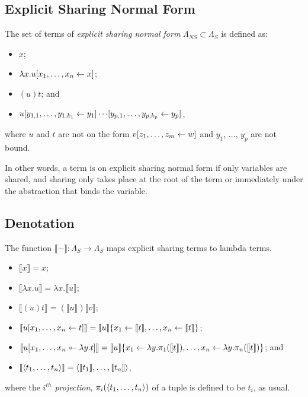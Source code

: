 \documentclass[11pt,a4paper]{article}
\theoremstyle{definition}
\theoremstyle{plain}
\theoremstyle{remark}
\begin{document}
\subsection{Explicit Sharing Normal Form}

The set of terms of \emph{explicit sharing normal form} $\Lambda_{NS}\subset\Lambda_S$ is defined as:

\begin{itemize}
	\item $x$;
	\item $\lambda x.{ { {u}[{{x_1},\dots,{x_n}}\leftarrow{x}] } }$;
	\item $(u)t$; and 
	\item ${ { {{ { {u}[{{y_{1,1}},\dots,{y_{1,k_1}}}\leftarrow{y_1}] } }\cdots}[{{y_{p,1}},\dots,{y_{p,k_p}}}\leftarrow{y_p}] } }$,
\end{itemize}
where $u$ and $t$ are not on the form ${ { {v}[{{z_1},\dots,{z_m}}\leftarrow{w}] } }$ and $y_1$, $\dots$, $y_p$ are not bound.

In other words, a term is on explicit sharing normal form if only variables are shared, and sharing only takes place at the root of the term or immediately under the abstraction that binds the variable.

\subsection{Denotation}

\newcommand{\terden}[1]{{\llbracket{#1}\rrbracket}}
\newcommand{\terpr}[2]{{\pi_{#1}({#2})}}

The function $\terden{-}:\Lambda_S\rightarrow\Lambda_S$ maps explicit sharing terms to lambda terms.

\begin{itemize}
	\item $\terden{x}=x$;
	\item $\terden{\lambda x.u}=\lambda x.\terden{u}$;
	\item $\terden{(u)t}=(\terden{u})\terden{v}$;
	\item $\terden{\tershare{u}{x_1}{x_n}{t}}=\tersubn{\terden{u}}{x_1}{\terden{t}}{x_n}{\terden{t}}$;
	\item $\terden{\terdist{u}{x_1}{x_n}{y}{t}}=\tersubn{\terden{u}}{x_1}{\lambda y.\terpr{1}{\terden{t}}}{x_n}{\lambda y.\terpr{n}{\terden{t}}}$; and
	\item $\terden{\tertuple{t_1}{t_n}}=\tertuple{\terden{t_1}}{\terden{t_n}}$,
\end{itemize}
where the \emph{$i^{th}$ projection}, $\terpr{i}{\tertuple{t_1}{t_n}}$ of a tuple is defined to be $t_i$, as usual.
\end{document}
